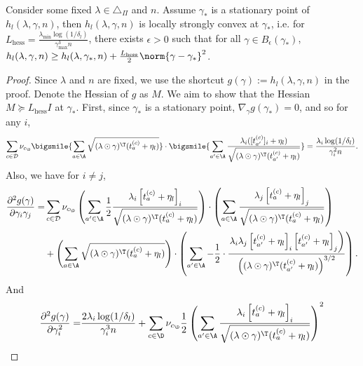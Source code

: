 \documentclass{article}
\newcommand{\mc}[1]{\mathcal{#1}}
\newcommand{\1}{\mathbf{1}}
\newcommand{\He}{\operatorname{hess}}
\begin{document}
\begin{lemma}\label{lem:local_strongly_convex}
Consider some fixed $\lambda\in\triangle_\Pi$ and $n$. Assume $\gamma_*$ is a stationary point of $h_l(\lambda,\gamma,n)$, then $h_l(\lambda,\gamma,n)$ is locally strongly convex at $\gamma_*$, i.e. for $L_{\He}=\frac{\lambda_{\min}\log(1/\delta_l)}{\gamma_{\max}^3 n}$, there exists $\epsilon>0$ such that for all $\gamma\in B_\epsilon(\gamma_*)$, $h_l(\lambda,\gamma,n)\geq h_l(\lambda,\gamma_*,n)+\frac{L_{\He}}{2}\norm{\gamma-\gamma_*}^2$. 
\end{lemma}
\begin{proof}
Since $\lambda$ and $n$ are fixed, we use the shortcut $g(\gamma):=h_l(\lambda,\gamma,n)$ in the proof. Denote the Hessian of $g$ as $M$. We aim to show that the Hessian $M\succeq L_{\He} I$ at $\gamma_*$. First, since $\gamma_*$ is a stationary point, $\nabla_\gamma g(\gamma_*)=0$, and so for any $i$, 
\begin{equation}\label{eqn:211}
    \sum_{c\in \mc{D}}\nu_{c_\D}\bigsmile{\sum_{a\in\A}\sqrt{(\lambda\odot\gamma)^\T (t_a^{(c)}+\eta_l)}}\cdot\bigsmile{\sum_{a'\in\A}\frac{\lambda_i([t_{a'}^{(c)}]_i+\eta_l)}{\sqrt{(\lambda\odot\gamma)^\T (t_{a'}^{(c)}+\eta_l)}}}=\frac{\lambda_i\log(1/\delta_l)}{\gamma_i^2 n}.
\end{equation}
Also, we have for $i\neq j$,
\begin{align*}
\frac{\partial^2 g(\gamma)}{\partial \gamma_{i} \gamma_{j}}=&\sum_{c\in \mc{D}}\nu_{c_\D}\left(\sum_{a^{\prime} \in \A} \frac{1}{2}\frac{\lambda_{i}\left[t_{a}^{(c)}+\eta_l\right]_{i}}{\sqrt{(\lambda\odot\gamma)^\T (t_a^{(c)}+\eta_l)}}\right) \cdot\left(\sum_{a \in \A} \frac{\lambda_{j}\left[t_{a}^{(c)}+\eta_l\right]_{j}}{\sqrt{(\lambda\odot\gamma)^\T (t_a^{(c)}+\eta_l)}}\right) \\
&+\left(\sum_{a \in \A} \sqrt{(\lambda\odot\gamma)^\T (t_a^{(c)}+\eta_l)}\right) \cdot\left(\sum_{a^{\prime} \in \A}-\frac{1}{2} \cdot \frac{\left.\lambda_{i} \lambda_{j}\left[t_{a'}^{(c)}+\eta_l\right]_{i}\left[t_{a'}^{(c)}+\eta_l\right]_{j}\right)}{\left((\lambda\odot\gamma)^\T (t_{a'}^{(c)}+\eta_l)\right)^{3 / 2}}\right).
\end{align*}
And 
\begin{align*}
\frac{\partial^2 g(\gamma)}{\partial \gamma_{i}^2}=&\frac{2\lambda_i\log(1/\delta_l)}{\gamma_i^3 n}+\sum_{c\in\D}\nu_{c_\D}\frac{1}{2}\left(\sum_{a^{\prime} \in \A} \frac{\lambda_{i}\left[t_{a}^{(c)}+\eta_l\right]_{i}}{\sqrt{(\lambda\odot\gamma)^\T (t_a^{(c)}+\eta_l)}}\right)^2\\

\end{align*}
\end{proof}
\end{document}
